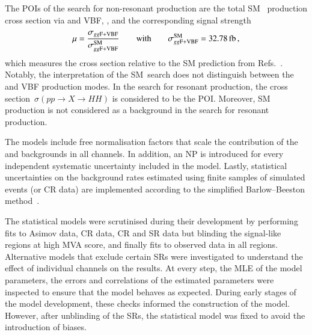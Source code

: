 The POIs of the search for non-resonant \HH production are the total SM~\HH
production cross section via \ggF and VBF, \xsecggfvbf, and the corresponding
signal strength
\begin{align*}
  \mu = \frac{\xsecggfvbf}{\xsecggfvbf^{\text{SM}}}
  \qquad \text{with} \qquad
  \xsecggfvbf^{\text{SM}} = \SI{32.78}{\femto\barn}
  \,\text{,}
\end{align*}
which measures the cross section relative to the SM prediction from
Refs.~\cite{Grazzini:2018bsd,Dreyer:2018qbw}. Notably, the interpretation of the
SM~\HH search does not distinguish between the \ggF and VBF production modes.
In the search for resonant \HH production, the cross
section~$\sigma(pp \to X \to HH)$ is considered to be the POI. Moreover, SM~\HH
production is not considered as a background in the search for resonant \HH
production.


The models include free normalisation factors that scale the contribution of the
\ZHF and \ttbar backgrounds in all channels. In addition, an NP is introduced
for every independent systematic uncertainty included in the model. Lastly,
statistical uncertainties on the background rates estimated using finite samples
of simulated events (or CR data) are implemented according to the simplified
Barlow--Beeston method~\cite{barlow1993,conway2011}.


The statistical models were scrutinised during their development by performing
fits to Asimov data, CR data, CR and SR data but blinding the signal-like
regions at high MVA score, and finally fits to observed data in all
regions. Alternative models that exclude certain SRs were investigated to
understand the effect of individual channels on the results. At every step, the
MLE of the model parameters, the errors and correlations of the estimated
parameters were inspected to ensure that the model behaves as expected. During
early stages of the model development, these checks informed the construction of
the model. However, after unblinding of the SRs, the statistical model was fixed
to avoid the introduction of biases.

